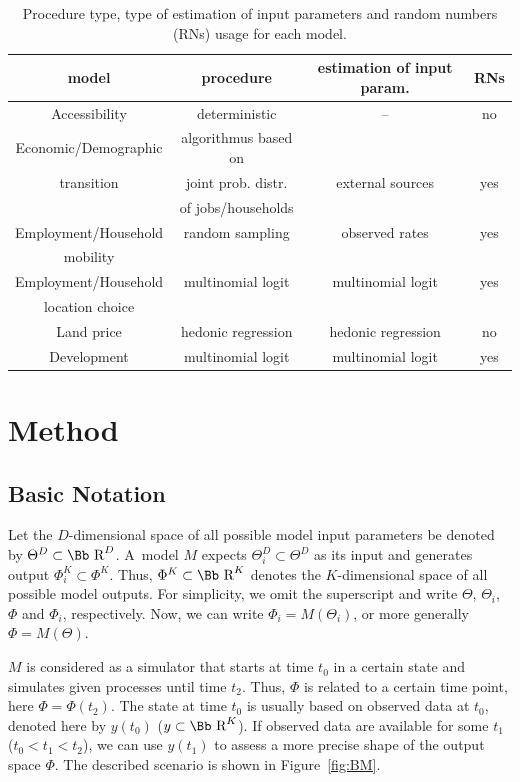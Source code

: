 \documentclass[11pt, fleqn]{article}
\newcommand{\real}{\mbox{\Bb R}}
\begin{document}
\begin{table}
\begin{center}
\begin{tabular}{|c||c|c|c|}\hline
model & procedure & estimation of input param. & RNs
\\\hline\hline
Accessibility & deterministic & -- & no \\\hline
Economic/Demographic & algorithmus based on &  &  \\
transition & joint prob. distr. & external sources & yes \\
& of jobs/households & & \\\hline
Employment/Household & random sampling & observed rates& yes\\
 mobility&&&\\\hline
Employment/Household & multinomial logit & multinomial logit & yes\\
location choice &&&\\\hline
Land price & hedonic regression & hedonic regression & no \\\hline
Development & multinomial logit & multinomial logit & yes\\\hline
\end{tabular}
\caption{\label{tab:models}\small Procedure type, type of estimation of input
  parameters and random numbers (RNs) usage for each model.}
\end{center}
\end{table}
\section{Method}
\label{sec:Method}
%
\subsection{Basic Notation}
%
Let the $D$-dimensional space of all possible model input parameters be
denoted by $\Theta^D \subset \real^D$.  A~model $M$ expects $\Theta^D_i
\subset \Theta^D$ as its input and generates output $\Phi^K_i \subset \Phi^K$.
Thus, $\Phi^K\subset\real^K$ denotes the $K$-dimensional space of all possible
model outputs. For simplicity, we omit the superscript and write $\Theta$,
$\Theta_i$, $\Phi$ and $\Phi_i$, respectively. Now, we can write $\Phi_i =
M(\Theta_i)$, or more generally $\Phi = M(\Theta)$.

$M$ is considered as a simulator that starts at time $t_0$ in a certain state
and simulates given processes until time $t_2$. Thus, $\Phi$ is related to a
certain time point, here $\Phi = \Phi(t_2)$.  The state at time $t_0$ is
usually based on observed data at $t_0$, denoted here by $y(t_0)$ ($y \subset
\real^K$). If observed data are available for some $t_1$ ($t_0 < t_1 < t_2$),
we can use $y(t_1)$ to assess a more precise shape of the output space $\Phi$.
The described scenario is shown in Figure~\ref{fig:BM}.
\end{document}
